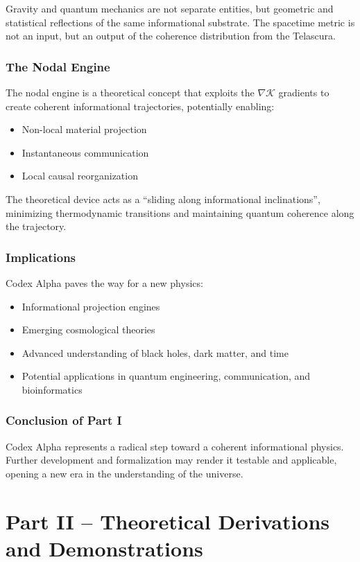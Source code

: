 \documentclass[12pt]{article}
\begin{document}
Gravity and quantum mechanics are not separate entities, but geometric and statistical reflections of the same informational substrate. The spacetime metric is not an input, but an output of the coherence distribution from the Telascura.

\section{The Nodal Engine}

The nodal engine is a theoretical concept that exploits the $\nabla \mathcal{K}$ gradients to create coherent informational trajectories, potentially enabling:
\begin{itemize}
    \item Non-local material projection
    \item Instantaneous communication
    \item Local causal reorganization
\end{itemize}
The theoretical device acts as a “sliding along informational inclinations”, minimizing thermodynamic transitions and maintaining quantum coherence along the trajectory.

\section{Implications}

Codex Alpha paves the way for a new physics:
\begin{itemize}
    \item Informational projection engines
    \item Emerging cosmological theories
    \item Advanced understanding of black holes, dark matter, and time
    \item Potential applications in quantum engineering, communication, and bioinformatics
\end{itemize}

\section{Conclusion of Part I}

Codex Alpha represents a radical step toward a coherent informational physics. Further development and formalization may render it testable and applicable, opening a new era in the understanding of the universe.
\part{Part II – Theoretical Derivations and Demonstrations}
\end{document}
